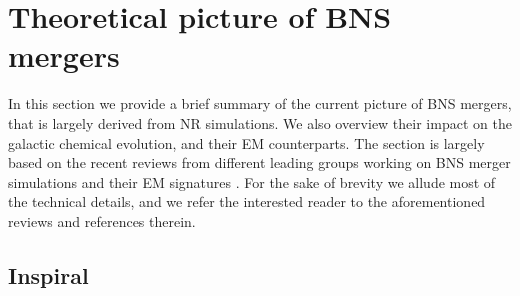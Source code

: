 %
%
%
%



\section{Theoretical picture of \ac{BNS} mergers}

In this section we provide a brief summary of the current picture of 
\ac{BNS} mergers, that is largely derived from \ac{NR} simulations.
We also overview their impact on the galactic chemical evolution, and their 
\ac{EM} counterparts. 
%
The section is largely based on the recent reviews from 
different leading groups working on \ac{BNS} merger simulations 
\citep{Radice:2020ddv,Bernuzzi:2020tgt,Shibata:2019wef} 
and their \ac{EM} signatures 
\citep{Kumar:2014upa,Fernandez:2015use,Metzger:2019zeh}.
%
For the sake of brevity we allude most of the technical details, 
and we refer the interested reader to the aforementioned  
reviews and references therein.


\subsection{Inspiral}\label{sec:intro:inspiral}

